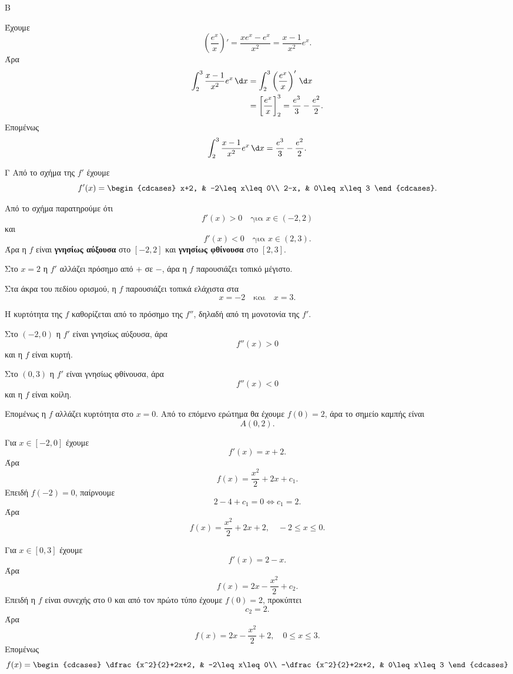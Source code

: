 \begin{thema}{Β}
\begin{erwthma}
\item Έχουμε
\[
\left(\frac{e^x}{x}\right)'=\frac{x e^x-e^x}{x^2}
=\frac{x-1}{x^2}e^x.
\]
Άρα
\begin{align*}
\dint_2^3\frac{x-1}{x^2}e^x\,\d x
&=\dint_2^3\left(\frac{e^x}{x}\right)'\,\d x\\
&=\left[\frac{e^x}{x}\right]_2^3
=\frac{e^3}{3}-\frac{e^2}{2}.
\end{align*}
Επομένως
\[
{\dint_2^3\frac{x-1}{x^2}e^x\,\d x=\frac{e^3}{3}-\frac{e^2}{2}}.
\]
\end{erwthma}
\end{thema}

\begin{thema}{Γ}
Από το σχήμα της $f'$ έχουμε
\[
f'(x)=
\begin{cdcases}
x+2, & -2\leq x\leq0\\
2-x, & 0\leq x\leq3
\end{cdcases}.
\]
\begin{erwthma}
\item Από το σχήμα παρατηρούμε ότι
\[
f'(x)>0\quad\text{για }x\in(-2,2)
\]
και
\[
f'(x)<0\quad\text{για }x\in(2,3).
\]
Άρα η $f$ είναι \textbf{γνησίως αύξουσα} στο $[-2,2]$ και \textbf{γνησίως φθίνουσα} στο $[2,3]$.

Στο $x=2$ η $f'$ αλλάζει πρόσημο από $+$ σε $-$, άρα η $f$ παρουσιάζει τοπικό μέγιστο.

Στα άκρα του πεδίου ορισμού, η $f$ παρουσιάζει τοπικά ελάχιστα στα
\[
x=-2
\quad\text{και}\quad
x=3.
\]

\item Η κυρτότητα της $f$ καθορίζεται από το πρόσημο της $f''$, δηλαδή από τη μονοτονία της $f'$.

Στο $(-2,0)$ η $f'$ είναι γνησίως αύξουσα, άρα
\[
f''(x)>0
\]
και η $f$ είναι κυρτή.

Στο $(0,3)$ η $f'$ είναι γνησίως φθίνουσα, άρα
\[
f''(x)<0
\]
και η $f$ είναι κοίλη.

Επομένως η $f$ αλλάζει κυρτότητα στο $x=0$. Από το επόμενο ερώτημα θα έχουμε $f(0)=2$, άρα το σημείο καμπής είναι
\[
{A(0,2)}.
\]

\item Για $x\in[-2,0]$ έχουμε
\[
f'(x)=x+2.
\]
Άρα
\[
f(x)=\frac{x^2}{2}+2x+c_1.
\]
Επειδή $f(-2)=0$, παίρνουμε
\[
2-4+c_1=0
\Leftrightarrow c_1=2.
\]
Άρα
\[
f(x)=\frac{x^2}{2}+2x+2,\quad -2\leq x\leq0.
\]

Για $x\in[0,3]$ έχουμε
\[
f'(x)=2-x.
\]
Άρα
\[
f(x)=2x-\frac{x^2}{2}+c_2.
\]
Επειδή η $f$ είναι συνεχής στο $0$ και από τον πρώτο τύπο έχουμε $f(0)=2$, προκύπτει
\[
c_2=2.
\]
Άρα
\[
f(x)=2x-\frac{x^2}{2}+2,\quad 0\leq x\leq3.
\]
Επομένως
\[
{
f(x)=
\begin{cdcases}
\dfrac{x^2}{2}+2x+2, & -2\leq x\leq0\\
-\dfrac{x^2}{2}+2x+2, & 0\leq x\leq3
\end{cdcases}}
\]


\end{erwthma}
\end{thema}
